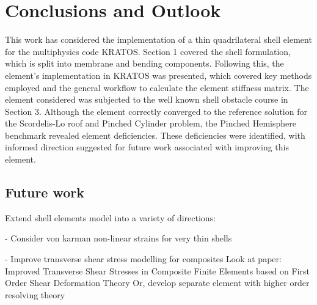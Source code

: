 
\chapter{Conclusions and Outlook}
\label{chap:conclusions}
\renewcommand{\Thema}{Conclusion}

This work has considered the implementation of a thin quadrilateral shell element for the multiphysics code KRATOS. Section 1 covered the shell formulation, which is split into membrane and bending components. Following this, the element's implementation in KRATOS was presented, which covered key methods employed and the general workflow to calculate the element stiffness matrix. The element considered was subjected to the well known shell obstacle course in Section 3. Although the element correctly converged to the reference solution for the Scordelis-Lo roof and Pinched Cylinder problem, the Pinched Hemisphere benchmark revealed element deficiencies. These deficiencies were identified, with informed direction suggested  for future work associated with improving this element. 

\section{Future work}

Extend shell elements model into a variety of directions:

- Consider von karman non-linear strains for very thin shells

- Improve transverse shear stress modelling for composites
Look at paper: Improved Transverse Shear Stresses in Composite Finite Elements based on First Order Shear Deformation Theory
Or, develop separate element with higher order resolving theory